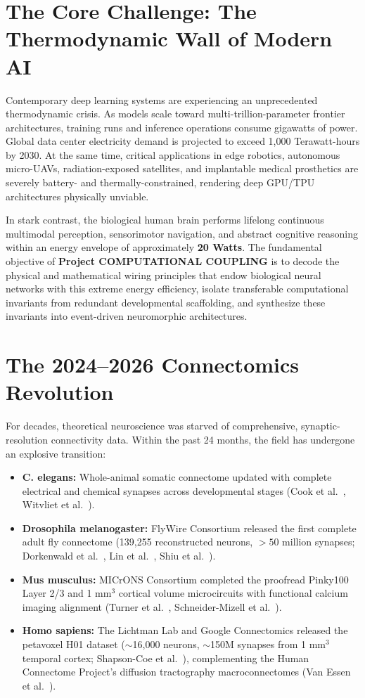 \documentclass[11pt,letterpaper]{report}
\begin{document}
\section{The Core Challenge: The Thermodynamic Wall of Modern AI}
Contemporary deep learning systems are experiencing an unprecedented thermodynamic crisis. As models scale toward multi-trillion-parameter frontier architectures, training runs and inference operations consume gigawatts of power. Global data center electricity demand is projected to exceed 1,000 Terawatt-hours by 2030. At the same time, critical applications in edge robotics, autonomous micro-UAVs, radiation-exposed satellites, and implantable medical prosthetics are severely battery- and thermally-constrained, rendering deep GPU/TPU architectures physically unviable.

In stark contrast, the biological human brain performs lifelong continuous multimodal perception, sensorimotor navigation, and abstract cognitive reasoning within an energy envelope of approximately \textbf{20 Watts}. The fundamental objective of \textbf{Project COMPUTATIONAL COUPLING} is to decode the physical and mathematical wiring principles that endow biological neural networks with this extreme energy efficiency, isolate transferable computational invariants from redundant developmental scaffolding, and synthesize these invariants into event-driven neuromorphic architectures.

\section{The 2024--2026 Connectomics Revolution}
For decades, theoretical neuroscience was starved of comprehensive, synaptic-resolution connectivity data. Within the past 24 months, the field has undergone an explosive transition:
\begin{itemize}[leftmargin=*]
    \item \textbf{C. elegans:} Whole-animal somatic connectome updated with complete electrical and chemical synapses across developmental stages (Cook et al.~\cite{cook2019whole}, Witvliet et al.~\cite{witvliet2021connectomes}).
    \item \textbf{Drosophila melanogaster:} FlyWire Consortium released the first complete adult fly connectome (139,255 reconstructed neurons, $>50$ million synapses; Dorkenwald et al.~\cite{dorkenwald2024neuronal}, Lin et al.~\cite{lin2024network}, Shiu et al.~\cite{shiu2024drosophila}).
    \item \textbf{Mus musculus:} MICrONS Consortium completed the proofread Pinky100 Layer 2/3 and 1 mm$^3$ cortical volume microcircuits with functional calcium imaging alignment (Turner et al.~\cite{microns2025functional}, Schneider-Mizell et al.~\cite{schneidermizell2025celltype}).
    \item \textbf{Homo sapiens:} The Lichtman Lab and Google Connectomics released the petavoxel H01 dataset ($\sim$16,000 neurons, $\sim$150M synapses from 1 mm$^3$ temporal cortex; Shapson-Coe et al.~\cite{shapsoncoe2024petavoxel}), complementing the Human Connectome Project's diffusion tractography macroconnectomes (Van Essen et al.~\cite{vanessen2012human}).
\end{itemize}
\end{document}
